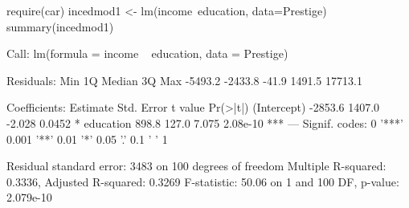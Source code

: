 \begin{Schunk}
\begin{Sinput}
 require(car)
 incedmod1 <- lm(income~education, data=Prestige)
 summary(incedmod1)
\end{Sinput}
\begin{Soutput}
Call:
lm(formula = income ~ education, data = Prestige)

Residuals:
    Min      1Q  Median      3Q     Max 
-5493.2 -2433.8   -41.9  1491.5 17713.1 

Coefficients:
            Estimate Std. Error t value Pr(>|t|)    
(Intercept)  -2853.6     1407.0  -2.028   0.0452 *  
education      898.8      127.0   7.075 2.08e-10 ***
---
Signif. codes:  0 '***' 0.001 '**' 0.01 '*' 0.05 '.' 0.1 ' ' 1

Residual standard error: 3483 on 100 degrees of freedom
Multiple R-squared:  0.3336,	Adjusted R-squared:  0.3269 
F-statistic: 50.06 on 1 and 100 DF,  p-value: 2.079e-10
\end{Soutput}
\end{Schunk}
